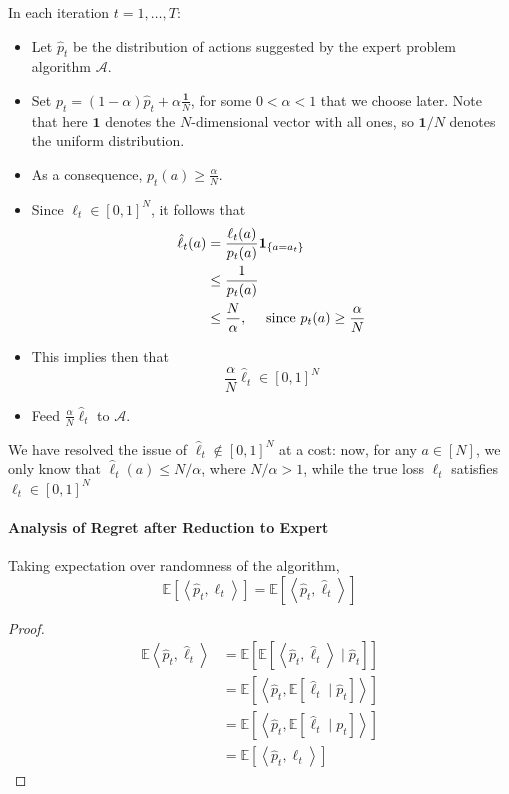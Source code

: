\documentclass{article}
\begin{document}
In each iteration $t=1, \ldots, T$:
\begin{itemize}
    \item Let $\hat{p}_{t}$ be the distribution of actions suggested by the expert problem algorithm $\mathcal{A} .$
    \item Set $p_{t}=(1-\alpha) \hat{p}_{t}+\alpha \frac{\mathbf{1}}{N}$, for some $0<\alpha<1$ that we choose later. Note that here $\mathbf{1}$ denotes the $N$-dimensional vector with all ones, so $\mathbf{1} / N$ denotes the uniform distribution.
    \item As a consequence, $p_{t}(a) \geq \frac{\alpha}{N}$.
    \item Since $\ell_{t} \in[0,1]^{N}$, it follows that
$$
\begin{aligned}
\hat{\ell}_{t}(a) &=\frac{\ell_{t}(a)}{p_{t}(a)} {\bf 1}_{\left\{a=a_{t}\right\}} \\
& \leq \frac{1}{p_{t}(a)} \\
& \leq \frac{N}{\alpha}, \quad \text { since } p_{t}(a) \geq \frac{\alpha}{N}
\end{aligned}
$$
\item This implies then that
$$
\frac{\alpha}{N} \hat{\ell}_{t} \in[0,1]^{N}
$$
\item Feed $\frac{\alpha}{N} \hat{\ell}_{t}$ to $\mathcal{A}$.
\end{itemize}
We have resolved the issue of $\hat{\ell}_{t} \notin[0,1]^{N}$ at a cost: now, for any $a \in[N]$, we only know that $\hat{\ell}_{t}(a) \leq N / \alpha$, where $N / \alpha>1$, while the true loss $\ell_{t}$ satisfies $\ell_{t} \in[0,1]^{N}$
\paragraph{Analysis of Regret after Reduction to Expert}
\begin{lema}
  Taking expectation over randomness of the algorithm,
$$
\mathbb{E}\left[\left\langle\hat{p}_{t}, \ell_{t}\right\rangle\right]=\mathbb{E}\left[\left\langle\hat{p}_{t}, \hat{\ell}_{t}\right\rangle\right]
$$
\end{lema} 
\begin{proof}
  $$
\begin{aligned}
\mathbb{E}\left\langle\hat{p}_{t}, \hat{\ell}_{t}\right\rangle &=\mathbb{E}\left[\mathbb{E}\left[\left\langle\hat{p}_{t}, \hat{\ell}_{t}\right\rangle \mid \hat{p}_{t}\right]\right] \\
&=\mathbb{E}\left[\left\langle\hat{p}_{t}, \mathbb{E}\left[\hat{\ell}_{t} \mid \hat{p}_{t}\right]\right\rangle\right] \\
&=\mathbb{E}\left[\left\langle\hat{p}_{t}, \mathbb{E}\left[\hat{\ell}_{t} \mid p_{t}\right]\right\rangle\right] \\
&=\mathbb{E}\left[\left\langle\hat{p}_{t}, \ell_{t}\right\rangle\right]
\end{aligned}
$$
\end{proof}
\end{document}
